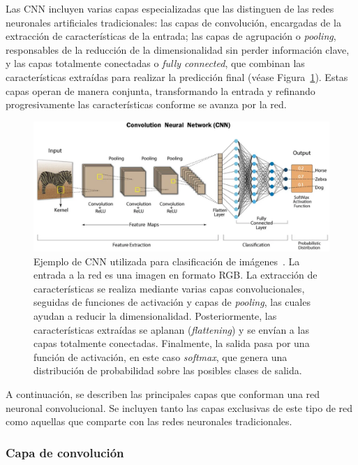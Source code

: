 Las CNN incluyen varias capas especializadas que las distinguen de las redes neuronales artificiales tradicionales: las capas de convolución, encargadas de la extracción de características de la entrada; las capas de agrupación o \emph{pooling}, responsables de la reducción de la dimensionalidad sin perder información clave, y las capas totalmente conectadas o \emph{fully connected}, que combinan las características extraídas para realizar la predicción final (véase Figura~\ref{fig:cnn}). Estas capas operan de manera conjunta, transformando la entrada y refinando progresivamente las características conforme se avanza por la red.

\begin{figure}[h]
    \centering
    \includegraphics[width=0.8\linewidth]{img/cnn.png}
    \caption[Ejemplo de CNN utilizada para clasificación de imágenes~\cite{CNNSwapna}.]{Ejemplo de CNN utilizada para clasificación de imágenes~\cite{CNNSwapna}. La entrada a la red es una imagen en formato RGB. La extracción de características se realiza mediante varias capas convolucionales, seguidas de funciones de activación y capas de \textit{pooling}, las cuales ayudan a reducir la dimensionalidad. Posteriormente, las características extraídas se aplanan (\textit{flattening}) y se envían a las capas totalmente conectadas. Finalmente, la salida pasa por una función de activación, en este caso \textit{softmax}, que genera una distribución de probabilidad sobre las posibles clases de salida.}\label{fig:cnn}
\end{figure}

A continuación, se describen las principales capas que conforman una red neuronal convolucional. Se incluyen tanto las capas exclusivas de este tipo de red como aquellas que comparte con las redes neuronales tradicionales.


\subsubsection{Capa de convolución}

